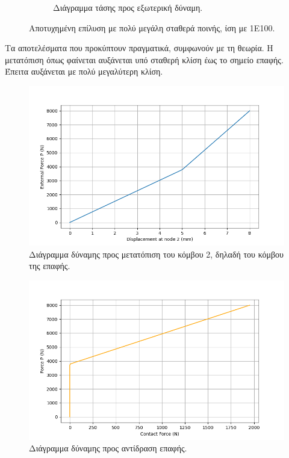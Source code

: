 \documentclass{article}
\begin{document}
\begin{figure}[H]
\begin{subfigure}{0.3\linewidth}
        \caption{Διάγραμμα τάσης προς εξωτερική δύναμη.}
    \end{subfigure}
    \caption{Αποτυχημένη επίλυση με πολύ μεγάλη σταθερά ποινής, ίση με 1E100.}
    \label{fig:astox}
\end{figure}

Τα αποτελέσματα που προκύπτουν πραγματικά, συμφωνούν με τη θεωρία. Η μετατόπιση όπως φαίνεται αυξάνεται υπό σταθερή κλίση έως το σημείο επαφής. Έπειτα αυξάνεται με πολύ μεγαλύτερη κλίση.

\begin{figure}[H]
    \centering
    \includegraphics[width=0.8\linewidth]{media/Fu.png}
    \caption{Διάγραμμα δύναμης προς μετατόπιση του κόμβου 2, δηλαδή του κόμβου της επαφής.}
    \label{fig:a1}
\end{figure}


\begin{figure}[H]
    \centering
    \includegraphics[width=0.8\linewidth]{media/FR.png}
    \caption{Διάγραμμα δύναμης προς αντίδραση επαφής.}
    \label{fig:a2}
\end{figure}
\end{document}
